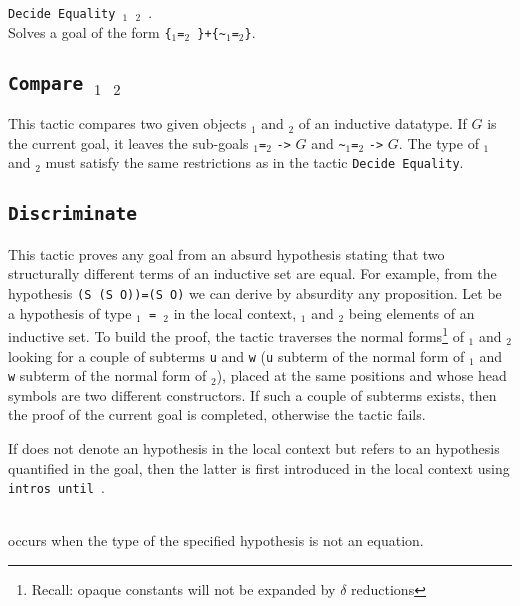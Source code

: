 \begin{Variants}
\item {\tt Decide Equality {\term}$_1$ {\term}$_2$ }.\\
 Solves a goal of the form {\tt \{}\term$_1${\tt =}\term$_2${\tt
\}+\{\verb|~|}\term$_1${\tt =}\term$_2${\tt \}}.
\end{Variants}

\subsection{\tt Compare \term$_1$ \term$_2$}
This tactic compares two given objects \term$_1$ and \term$_2$ 
of an inductive datatype. If $G$ is the current goal, it leaves the sub-goals
\term$_1${\tt =}\term$_2$ {\tt ->} $G$ and \verb|~|\term$_1${\tt =}\term$_2$
{\tt ->} $G$. The type
of \term$_1$ and \term$_2$ must satisfy the same restrictions as in the tactic
\texttt{Decide Equality}.

\subsection {\tt Discriminate {\ident}}
\label{Discriminate}
This tactic proves any goal from an absurd
hypothesis stating that two structurally different terms of an
inductive set are equal. For example, from the hypothesis {\tt (S (S
  O))=(S O)} we can derive by absurdity any proposition.  Let {\ident}
be a hypothesis of type {\tt{\term$_1$} = {\term$_2$}} in the local
context, {\term$_1$} and {\term$_2$} being elements of an inductive set.
To build the proof, the tactic traverses the normal
forms\footnote{Recall: opaque constants will not be expanded by
  $\delta$ reductions} of {\term$_1$} and {\term$_2$} looking for a
couple of subterms {\tt u} and {\tt w} ({\tt u} subterm of the normal
form of {\term$_1$} and {\tt w} subterm of the normal form of
{\term$_2$}), placed at the same positions and whose
head symbols are two different constructors. If such a couple of subterms
exists, then the proof of the current goal is completed,
otherwise the tactic fails.

\Rem If {\ident} does not denote an hypothesis in the local context
but refers to an hypothesis quantified in the goal, then the
latter is first introduced in the local context using
\texttt{intros until \ident}.

\begin{ErrMsgs}
\item {\ident}  \\
  occurs when the type of the specified hypothesis is not an equation.
\end{ErrMsgs}  


